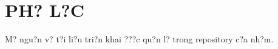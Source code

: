 \appendix
\chapter*{PH? L?C}
M? ngu?n v? t?i li?u tri?n khai ???c qu?n l? trong repository c?a nh?m.
